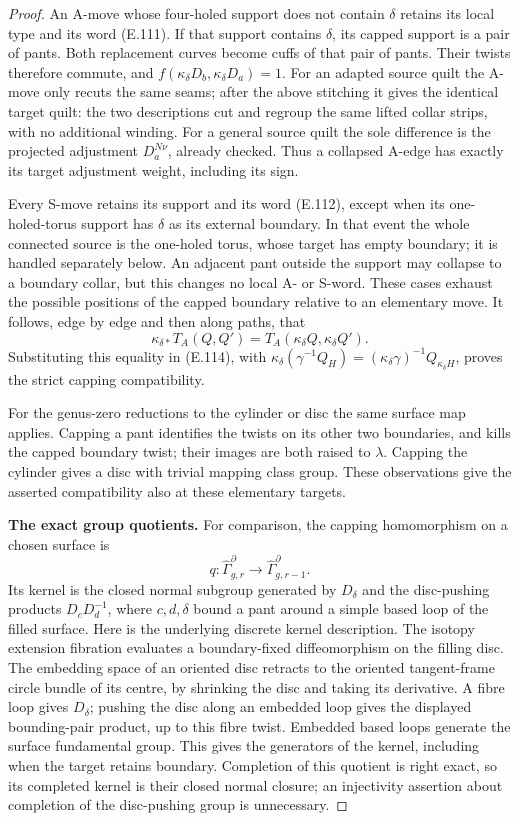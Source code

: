 \begin{proof}
An A-move whose four-holed support
does not contain $\delta$ retains
its local type and its word (E.111).
If that support contains $\delta$,
its capped support is a pair of
pants.  Both replacement curves
become cuffs of that pair of pants.
Their twists therefore commute,
and
$f(\kappa_\delta D_b,\kappa_\delta D_a)=1$.
For an adapted source quilt the
A-move only recuts the same seams;
after the above stitching it gives
the identical target quilt: the
two descriptions cut and regroup
the same lifted collar strips,
with no additional winding.
For a general source quilt the
sole difference is the projected
adjustment $D_a^{N\nu}$, already
checked.  Thus a collapsed A-edge
has exactly its target adjustment
weight, including its sign.

Every S-move retains its support
and its word (E.112), except when
its one-holed-torus support has
$\delta$ as its external boundary.
In that event the whole connected
source is the one-holed torus,
whose target has empty boundary;
it is handled separately below.
An adjacent pant outside the support
may collapse to a boundary collar,
but this changes no local A- or
S-word.  These cases exhaust the
possible positions of the capped
boundary relative to an elementary
move.  It follows, edge by edge
and then along paths, that
\[
 \kappa_{\delta *}T_A(Q,Q')
     =T_A(\kappa_\delta Q,\kappa_\delta Q').             \tag{E.131}
\]
Substituting this equality in
(E.114), with
$\kappa_\delta(\gamma^{-1}Q_H)
=(\kappa_\delta\gamma)^{-1}
   Q_{\kappa_\delta H}$, proves the
strict capping compatibility.

For the genus-zero reductions to
the cylinder or disc the same
surface map applies.  Capping a
pant identifies the twists on
its other two boundaries, and
kills the capped boundary twist;
their images are both raised to
$\lambda$.  Capping the cylinder
gives a disc with trivial mapping
class group.  These observations
give the asserted compatibility
also at these elementary targets.

\medskip\noindent\textbf{The exact group quotients.}
For comparison, the capping
homomorphism on a chosen surface is
\[
 q:\widehat\Gamma_{g,r}^{\partial}
        \longrightarrow
        \widehat\Gamma_{g,r-1}^{\partial}.
\]
Its kernel is the closed normal
subgroup generated by $D_\delta$
and the disc-pushing products
$D_cD_d^{-1}$, where $c,d,\delta$
bound a pant around a simple
based loop of the filled surface.
Here is the underlying discrete
kernel description.  The isotopy
extension fibration evaluates a
boundary-fixed diffeomorphism on
the filling disc.  The embedding
space of an oriented disc retracts
to the oriented tangent-frame
circle bundle of its centre,
by shrinking the disc and taking
its derivative.  A fibre loop
gives $D_\delta$; pushing the
disc along an embedded loop
gives the displayed bounding-pair
product, up to this fibre twist.
Embedded based loops generate
the surface fundamental group.
This gives the generators of
the kernel, including when the
target retains boundary.
Completion of this quotient is
right exact, so its completed
kernel is their closed normal
closure; an injectivity assertion
about completion of the
disc-pushing group is unnecessary.


\end{proof}

